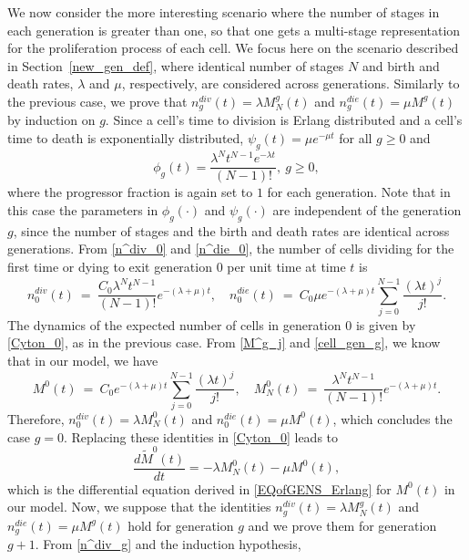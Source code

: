 \documentclass[10pt]{article}
\numberwithin{equation}{section}
\begin{document}
We now consider the more interesting scenario where the number of stages in each generation is greater than one, so that one gets a multi-stage representation for the proliferation process of each cell. We focus here on the scenario described in Section~\ref{new_gen_def}, where identical number of stages $N$ and birth and death rates, $\lambda$ and $\mu$, respectively, are considered across generations. Similarly to the previous case, we prove that $n^{div}_{g}(t) = \lambda M^g_N(t)$ and $n^{die}_{g}(t) = \mu M^g(t)$ by induction on $g$. Since a cell's time to division is Erlang distributed and a cell's time to death is exponentially 
distributed, $\psi_g(t) = \mu e^{-\mu t}$ for all $g \ge 0$ and 
\begin{equation*}
    \phi_g(t) = \frac{\lambda^N t^{N-1} e^{-\lambda t}}{(N-1)!}, \ g \ge 0,
\end{equation*}
where the progressor fraction is again set to $1$ for each generation. Note that in this case the parameters in $\phi_g(\cdot)$ and $\psi_g(\cdot)$ are independent of the generation $g$, since the number of stages and the birth and death rates are identical across generations. From \eqref{n^div_0} and \eqref{n^die_0}, the number of cells dividing for the first time or dying to exit generation $0$  per unit time at time $t$ is
\begin{equation*}
    n^{div}_{0}(t) \ =\ \frac{C_0 \lambda^N t^{N-1}}{(N-1)!} e^{-(\lambda+\mu) t}, \quad
    n^{die}_{0}(t) \ =\ C_0 \mu e^{-(\lambda+\mu) t} \sum_{j=0}^{N-1} \frac{(\lambda t)^j}{j!}.
\end{equation*}
The dynamics of the expected number of cells in generation $0$  is given by \eqref{Cyton_0}, as in the previous case. From \eqref{M^g_j} and \eqref{cell_gen_g}, we know that in our model, we have
\begin{equation*}
        M^0(t) \ =\ C_0 e^{-(\lambda+\mu) t} \sum_{j=0}^{N-1} \frac{(\lambda t)^j}{j!}, \quad
        M^0_N(t) \ =\ \frac{\lambda^N t^{N-1}}{(N-1)!} e^{-(\lambda+\mu) t}.
\end{equation*}
Therefore, $n^{div}_{0}(t)= \lambda M^0_N(t)$ and $n^{die}_{0}(t)= \mu M^0(t)$, which concludes the case $g=0$. Replacing these identities in \eqref{Cyton_0} leads to 
\begin{equation*}
    \frac{d{\widetilde M}^0(t)}{dt} = -\lambda M^0_N(t) - \mu M^0(t),
\end{equation*}
which is the differential equation derived in \eqref{EQofGENS_Erlang} for $M^0(t)$ in our model. Now, we suppose that the identities $n^{div}_{g}(t) = \lambda M^g_N(t)$ and $n^{die}_{g}(t) = \mu M^g(t)$ hold for generation $g$ and we prove them for generation $g+1$. From \eqref{n^div_g} and the induction hypothesis,
\end{document}

